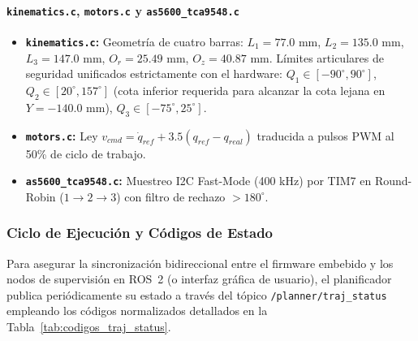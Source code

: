 \documentclass[12pt, a4paper]{report}
\begin{document}
\paragraph{\texttt{kinematics.c}, \texttt{motors.c} y \texttt{as5600\_tca9548.c}}
\begin{itemize}
    \item \textbf{\texttt{kinematics.c}:} Geometría de cuatro barras: $L_1 = 77.0\text{ mm}$, $L_2 = 135.0\text{ mm}$, $L_3 = 147.0\text{ mm}$, $O_r = 25.49\text{ mm}$, $O_z = 40.87\text{ mm}$. Límites articulares de seguridad unificados estrictamente con el hardware: $Q_1 \in [-90^\circ, 90^\circ]$, $Q_2 \in [20^\circ, 157^\circ]$ (cota inferior requerida para alcanzar la cota lejana en $Y = -140.0\text{ mm}$), $Q_3 \in [-75^\circ, 25^\circ]$.
    \item \textbf{\texttt{motors.c}:} Ley $v_{cmd} = \dot{q}_{ref} + 3.5(q_{ref} - q_{real})$ traducida a pulsos PWM al 50\% de ciclo de trabajo.
    \item \textbf{\texttt{as5600\_tca9548.c}:} Muestreo I2C Fast-Mode (400 kHz) por TIM7 en Round-Robin ($1 \rightarrow 2 \rightarrow 3$) con filtro de rechazo $> 180^\circ$.
\end{itemize}

\subsubsection{Ciclo de Ejecución y Códigos de Estado}
Para asegurar la sincronización bidireccional entre el firmware embebido y los nodos de supervisión en ROS~2 (o interfaz gráfica de usuario), el planificador publica periódicamente su estado a través del tópico \texttt{/planner/traj\_status} empleando los códigos normalizados detallados en la Tabla~\ref{tab:codigos_traj_status}.
\end{document}
